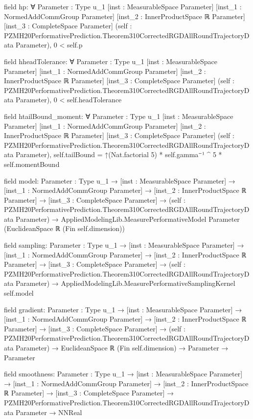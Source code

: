 \documentclass[10pt]{article}
\begin{document}
\begin{ReviewVerbatim}
field hp:
∀ {Parameter : Type u_1} [inst : MeasurableSpace Parameter] [inst_1 : NormedAddCommGroup Parameter]
  [inst_2 : InnerProductSpace ℝ Parameter] [inst_3 : CompleteSpace Parameter]
  (self : PZMH20PerformativePrediction.Theorem310CorrectedRGDAllRoundTrajectoryData Parameter), 0 < self.p

field hheadTolerance:
∀ {Parameter : Type u_1} [inst : MeasurableSpace Parameter] [inst_1 : NormedAddCommGroup Parameter]
  [inst_2 : InnerProductSpace ℝ Parameter] [inst_3 : CompleteSpace Parameter]
  (self : PZMH20PerformativePrediction.Theorem310CorrectedRGDAllRoundTrajectoryData Parameter), 0 < self.headTolerance

field htailBound_moment:
∀ {Parameter : Type u_1} [inst : MeasurableSpace Parameter] [inst_1 : NormedAddCommGroup Parameter]
  [inst_2 : InnerProductSpace ℝ Parameter] [inst_3 : CompleteSpace Parameter]
  (self : PZMH20PerformativePrediction.Theorem310CorrectedRGDAllRoundTrajectoryData Parameter),
  self.tailBound = ↑(Nat.factorial 5) * self.gamma⁻¹ ^ 5 * self.momentBound

field model:
{Parameter : Type u_1} →
  [inst : MeasurableSpace Parameter] →
    [inst_1 : NormedAddCommGroup Parameter] →
      [inst_2 : InnerProductSpace ℝ Parameter] →
        [inst_3 : CompleteSpace Parameter] →
          (self : PZMH20PerformativePrediction.Theorem310CorrectedRGDAllRoundTrajectoryData Parameter) →
            AppliedModelingLib.MeasurePerformativeModel Parameter (EuclideanSpace ℝ (Fin self.dimension))

field sampling:
{Parameter : Type u_1} →
  [inst : MeasurableSpace Parameter] →
    [inst_1 : NormedAddCommGroup Parameter] →
      [inst_2 : InnerProductSpace ℝ Parameter] →
        [inst_3 : CompleteSpace Parameter] →
          (self : PZMH20PerformativePrediction.Theorem310CorrectedRGDAllRoundTrajectoryData Parameter) →
            AppliedModelingLib.MeasurePerformativeSamplingKernel self.model

field gradient:
{Parameter : Type u_1} →
  [inst : MeasurableSpace Parameter] →
    [inst_1 : NormedAddCommGroup Parameter] →
      [inst_2 : InnerProductSpace ℝ Parameter] →
        [inst_3 : CompleteSpace Parameter] →
          (self : PZMH20PerformativePrediction.Theorem310CorrectedRGDAllRoundTrajectoryData Parameter) →
            EuclideanSpace ℝ (Fin self.dimension) → Parameter → Parameter

field smoothness:
{Parameter : Type u_1} →
  [inst : MeasurableSpace Parameter] →
    [inst_1 : NormedAddCommGroup Parameter] →
      [inst_2 : InnerProductSpace ℝ Parameter] →
        [inst_3 : CompleteSpace Parameter] →
          PZMH20PerformativePrediction.Theorem310CorrectedRGDAllRoundTrajectoryData Parameter → NNReal


\end{ReviewVerbatim}
\end{document}
